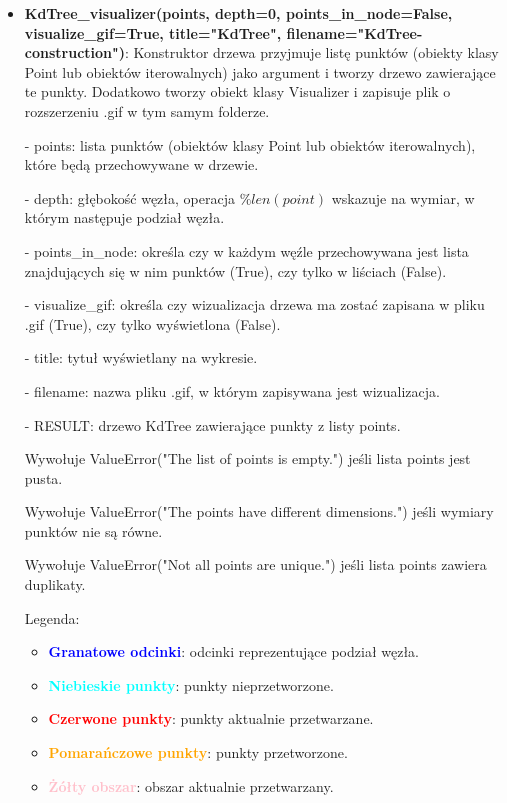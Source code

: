 \documentclass{lab}
\begin{document}
\begin{itemize}
  \item \textbf{KdTree\_visualizer(points, depth=0, points\_in\_node=False, visualize\_gif=True, title="KdTree", filename="KdTree-construction")}:
  Konstruktor drzewa przyjmuje listę punktów (obiekty klasy Point lub obiektów iterowalnych) jako argument i tworzy drzewo zawierające te punkty. Dodatkowo tworzy obiekt klasy Visualizer i zapisuje plik o rozszerzeniu .gif w tym samym folderze.

  - points: lista punktów (obiektów klasy Point lub obiektów iterowalnych), które będą przechowywane w drzewie.

  - depth: głębokość węzła, operacja $\%len(point)$ wskazuje na wymiar, w którym następuje podział węzła.

  - points\_in\_node: określa czy w każdym węźle przechowywana jest lista znajdujących się w nim punktów (True), czy tylko w liściach (False).

  - visualize\_gif: określa czy wizualizacja drzewa ma zostać zapisana w pliku .gif (True), czy tylko wyświetlona (False).

  - title: tytuł wyświetlany na wykresie.

  - filename: nazwa pliku .gif, w którym zapisywana jest wizualizacja.

  - RESULT: drzewo KdTree zawierające punkty z listy points.

  Wywołuje ValueError("The list of points is empty.") jeśli lista points jest pusta.

  Wywołuje ValueError("The points have different dimensions.") jeśli wymiary punktów nie są równe.

  Wywołuje ValueError("Not all points are unique.") jeśli lista points zawiera duplikaty.

  Legenda:
  \begin{itemize}
      \item \textbf{\textcolor{blue}{Granatowe odcinki}}: odcinki reprezentujące podział węzła.
      \item \textbf{\textcolor{cyan}{Niebieskie punkty}}: punkty nieprzetworzone.
      \item \textbf{\textcolor{red}{Czerwone punkty}}: punkty aktualnie przetwarzane.
      \item \textbf{\textcolor{orange}{Pomarańczowe punkty}}: punkty przetworzone.
      \item \textbf{\textcolor{pink}{Żółty obszar}}: obszar aktualnie przetwarzany.
  \end{itemize}


\end{itemize}
\end{document}

